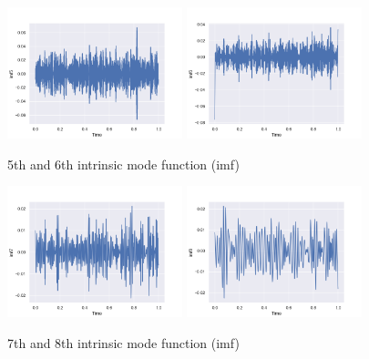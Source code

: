 \documentclass[11pt, oneside]{article}   	%
\begin{document}
\begin{flushleft}
\begin{figure}[H] %
   \centering
   \includegraphics[width=2in]{imf/imf5.png} 
     \includegraphics[width=2in]{imf/imf6.png} 
   \caption{5th and 6th intrinsic mode function (imf)}
   \label{fig:imf56}
\end{figure}

\begin{figure}[H] %
   \centering
   \includegraphics[width=2in]{imf/imf7.png} 
     \includegraphics[width=2in]{imf/imf8.png} 
   \caption{7th and 8th intrinsic mode function (imf)}
   \label{fig:imf78}
\end{figure}


\end{flushleft}
\end{document}
